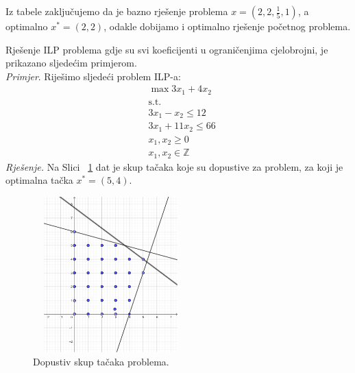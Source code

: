 \documentclass[a4paper, utf8, 11pt, colorlinks]{book}
\begin{document}
Iz tabele zaključujemo da je bazno rješenje problema 
$x=(2,2, \frac{1}{5}, 1)$, a optimalno $x^* = (2, 2)$, odakle dobijamo i optimalno rješenje početnog problema. 

Rješenje ILP problema gdje su svi koeficijenti u ograničenjima cjelobrojni, je prikazano sljedećim primjerom. \\
\emph{Primjer}. Riješimo sljedeći problem ILP-a:
\begin{align*}
    &\max 3 x_1 + 4 x_2 \\
    &\mbox{s.t.} \\
    & 3 x_1 - x_2 \leq 12 \\
    & 3 x_1 + 11 x_2 \leq 66 \\
    & x_1, x_2 \geq 0 \\
    & x_1, x_2 \in \mathbb{Z}
\end{align*}
\emph{Rješenje. }
Na Slici~ \ref{fig:region_ilp_primjer_2} dat je skup tačaka koje su dopustive za problem, za koji je optimalna tačka $x^*=(5,4)$.
\begin{figure}
    \centering
    \includegraphics[width=170pt,height=170pt]{region_ilp_primjer_2.eps}
    \caption{Dopustiv skup tačaka problema.}
    \label{fig:region_ilp_primjer_2}
\end{figure}
\end{document}
